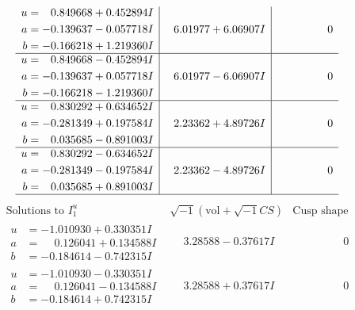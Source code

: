\documentclass[1p]{elsarticle_modified}
\theoremstyle{definition}
\newcommand{\I}{\sqrt{-1}}
\begin{document}
$$\begin{array}{c|c|c}
\begin{aligned}
u &= \phantom{-}0.849668 + 0.452894 I \\
a &= -0.139637 - 0.057718 I \\
b &= -0.166218 + 1.219360 I\end{aligned}
 & \phantom{-}6.01977 + 6.06907 I & \phantom{-0.000000 } 0 \\ \hline\begin{aligned}
u &= \phantom{-}0.849668 - 0.452894 I \\
a &= -0.139637 + 0.057718 I \\
b &= -0.166218 - 1.219360 I\end{aligned}
 & \phantom{-}6.01977 - 6.06907 I & \phantom{-0.000000 } 0 \\ \hline\begin{aligned}
u &= \phantom{-}0.830292 + 0.634652 I \\
a &= -0.281349 + 0.197584 I \\
b &= \phantom{-}0.035685 - 0.891003 I\end{aligned}
 & \phantom{-}2.23362 + 4.89726 I & \phantom{-0.000000 } 0 \\ \hline\begin{aligned}
u &= \phantom{-}0.830292 - 0.634652 I \\
a &= -0.281349 - 0.197584 I \\
b &= \phantom{-}0.035685 + 0.891003 I\end{aligned}
 & \phantom{-}2.23362 - 4.89726 I & \phantom{-0.000000 } 0\\
 \hline 
 \end{array}$$\newpage$$\begin{array}{c|c|c}  
\text{Solutions to }I^u_{1}& \I (\text{vol} + \sqrt{-1}CS) & \text{Cusp shape}\\
 \hline 
\begin{aligned}
u &= -1.010930 + 0.330351 I \\
a &= \phantom{-}0.126041 + 0.134588 I \\
b &= -0.184614 - 0.742315 I\end{aligned}
 & \phantom{-}3.28588 - 0.37617 I & \phantom{-0.000000 } 0 \\ \hline\begin{aligned}
u &= -1.010930 - 0.330351 I \\
a &= \phantom{-}0.126041 - 0.134588 I \\
b &= -0.184614 + 0.742315 I\end{aligned}
 & \phantom{-}3.28588 + 0.37617 I & \phantom{-0.000000 } 0 \\ \hline\begin{aligned}

\end{aligned}
\end{array}$$
\end{document}
